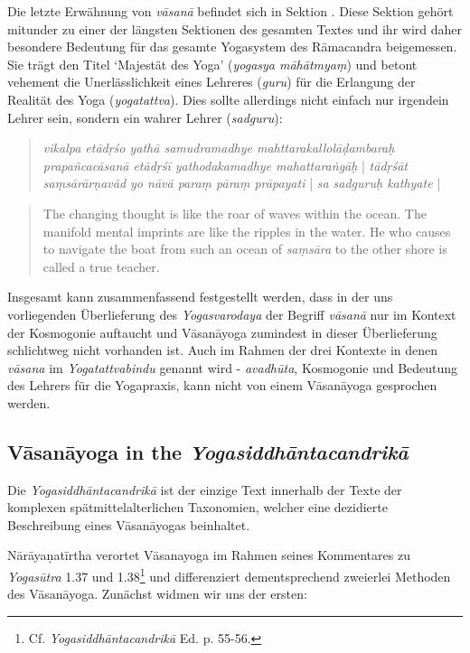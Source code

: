   Die letzte Erwähnung von \textit{vāsanā} befindet sich in Sektion . Diese Sektion gehört mitunder zu einer der längsten Sektionen des gesamten Textes und ihr wird daher besondere Bedeutung für das gesamte Yogasystem des Rāmacandra beigemessen. Sie trägt den Titel `Majestät des Yoga' (\textit{yogasya māhātmyaṃ}) und betont vehement die Unerlässlichkeit eines Lehreres (\textit{guru}) für die Erlangung der Realität des Yoga (\textit{yogatattva}). Dies sollte allerdings nicht einfach nur irgendein Lehrer sein, sondern ein wahrer Lehrer (\textit{sadguru}):
  \begin{quote}
    \textit{vikalpa etādṛśo yathā samudramadhye mahttarakallolāḍambaraḥ prapañcacāsanā etādṛśī yathodakamadhye mahattaraṅgāḥ} | \textit{tādṛśāt saṃsārārṇavād yo nāvā paraṃ pāraṃ prāpayati} | \textit{sa sadguruḥ kathyate} |
    \end{quote}
  \begin{quote}
    The changing thought is like the roar of waves within the ocean. The manifold mental imprints are like the ripples in the water. He who causes to navigate the boat from such an ocean of \textit{saṃsāra} to the other shore is called a true teacher.
  \end{quote}

  Insgesamt kann zusammenfassend festgestellt werden, dass in der uns vorliegenden Überlieferung des \textit{Yogasvarodaya} der Begriff \textit{vāsanā} nur im Kontext der Kosmogonie auftaucht und Vāsanāyoga zumindest in dieser Überlieferung schlichtweg nicht vorhanden ist. Auch im Rahmen der drei Kontexte in denen \textit{vāsana} im \textit{Yogatattvabindu} genannt wird - \textit{avadhūta}, Kosmogonie und Bedeutung des Lehrers für die Yogapraxis, kann nicht von einem Vāsanāyoga gesprochen werden.

\subsection{Vāsanāyoga in the \textit{Yogasiddhāntacandrikā}}
\label{laksyayogaintrocandrika}  

Die \textit{Yogasiddhāntacandrikā} ist der einzige Text innerhalb der Texte der komplexen spätmittelalterlichen Taxonomien, welcher eine dezidierte Beschreibung eines Vāsanāyogas beinhaltet.

Nārāyaṇatīrtha verortet Vāsanayoga im Rahmen seines Kommentares zu \textit{Yogasūtra} 1.37 und 1.38\footnote{Cf. \textit{Yogasiddhāntacandrikā} Ed. p. 55-56.} und differenziert dementsprechend zweierlei Methoden des Vāsanāyoga.
Zunächst widmen wir uns der ersten:

